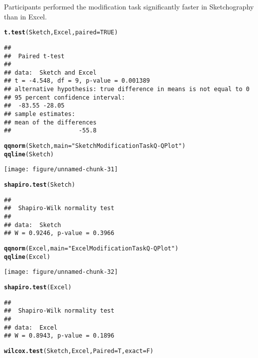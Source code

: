 \documentclass[12pt, twoside, a4paper, openright]{report}\usepackage[]{graphicx}\usepackage[]{color}
\makeatletter
\def\maxwidth{ %
  \ifdim\Gin@nat@width>\linewidth
    \linewidth
  \else
    \Gin@nat@width
  \fi
}
\newcommand{\hlnum}[1]{\textcolor[rgb]{0.686,0.059,0.569}{#1}}%
\newcommand{\hlstr}[1]{\textcolor[rgb]{0.192,0.494,0.8}{#1}}%
\newcommand{\hlstd}[1]{\textcolor[rgb]{0.345,0.345,0.345}{#1}}%
\newcommand{\hlkwc}[1]{\textcolor[rgb]{0.333,0.667,0.333}{#1}}%
\newcommand{\hlkwd}[1]{\textcolor[rgb]{0.737,0.353,0.396}{\textbf{#1}}}%
\newenvironment{kframe}{%
 \def\at@end@of@kframe{}%
 \ifinner\ifhmode%
  \def\at@end@of@kframe{\end{minipage}}%
  \begin{minipage}{\columnwidth}%
 \fi\fi%
 \def\FrameCommand##1{\hskip\@totalleftmargin \hskip-\fboxsep
 \colorbox{shadecolor}{##1}\hskip-\fboxsep
     \hskip-\linewidth \hskip-\@totalleftmargin \hskip\columnwidth}%
 \MakeFramed {\advance\hsize-\width
   \@totalleftmargin\z@ \linewidth\hsize
   \@setminipage}}%
 {\par\unskip\endMakeFramed%
 \at@end@of@kframe}
\newenvironment{knitrout}{}{} %
\makeatother
\begin{document}
Participants performed the modification task significantly faster in Sketchography than in Excel. 
\begin{knitrout}
\color{fgcolor}\begin{kframe}
\begin{alltt}
\hlkwd{t.test}\hlstd{(Sketch, Excel,} \hlkwc{paired} \hlstd{=} \hlnum{TRUE}\hlstd{)}
\end{alltt}
\begin{verbatim}
## 
## 	Paired t-test
## 
## data:  Sketch and Excel
## t = -4.548, df = 9, p-value = 0.001389
## alternative hypothesis: true difference in means is not equal to 0
## 95 percent confidence interval:
##  -83.55 -28.05
## sample estimates:
## mean of the differences 
##                   -55.8
\end{verbatim}
\begin{alltt}
\hlkwd{qqnorm}\hlstd{(Sketch,} \hlkwc{main} \hlstd{=} \hlstr{"Sketch Modification Task Q-Q Plot"}\hlstd{)}
\hlkwd{qqline}\hlstd{(Sketch)}
\end{alltt}
\end{kframe}
\texttt{[image: figure/unnamed-chunk-31]} 
\begin{kframe}\begin{alltt}
\hlkwd{shapiro.test}\hlstd{(Sketch)}
\end{alltt}
\begin{verbatim}
## 
## 	Shapiro-Wilk normality test
## 
## data:  Sketch
## W = 0.9246, p-value = 0.3966
\end{verbatim}
\begin{alltt}
\hlkwd{qqnorm}\hlstd{(Excel,} \hlkwc{main} \hlstd{=} \hlstr{"Excel Modification Task Q-Q Plot"}\hlstd{)}
\hlkwd{qqline}\hlstd{(Excel)}
\end{alltt}
\end{kframe}
\texttt{[image: figure/unnamed-chunk-32]} 
\begin{kframe}\begin{alltt}
\hlkwd{shapiro.test}\hlstd{(Excel)}
\end{alltt}
\begin{verbatim}
## 
## 	Shapiro-Wilk normality test
## 
## data:  Excel
## W = 0.8943, p-value = 0.1896
\end{verbatim}
\begin{alltt}
\hlkwd{wilcox.test}\hlstd{(Sketch, Excel,} \hlkwc{Paired} \hlstd{= T,} \hlkwc{exact} \hlstd{= F)}
\end{alltt}
\begin{verbatim}

\end{verbatim}
\end{kframe}
\end{knitrout}
\end{document}
